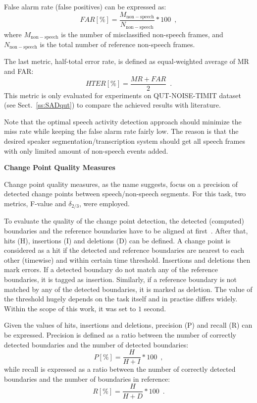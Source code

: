 \documentclass[FM,noheader,EN,bwtitles]{tulthesis}
\begin{document}
False alarm rate (false positives) can be expressed as:
\begin{equation}
FAR [\%] = \frac{M_{\mathrm{non-speech}}}{N_{\mathrm{non-speech}}} * 100 \enspace,
\label{eq:far}\end{equation}
where $M_\mathrm{{non-speech}}$ is the number of misclassified non-speech frames, and $N_\mathrm{{non-speech}}$ is the total number of reference non-speech frames.

The last metric, half-total error rate, is defined as equal-weighted average of MR and FAR:
\begin{equation}
HTER [\%] = \frac{MR + FAR}{2}\enspace.
\label{eq:hter}\end{equation}
This metric is only evaluated for experiments on QUT-NOISE-TIMIT dataset (see Sect.~\ref{ss:SADqut}) to compare the achieved results with literature.

Note that the optimal speech activity detection approach should minimize the miss rate while keeping the false alarm rate fairly low.
The reason is that the desired speaker segmentation/transcription system should get all speech frames with only limited amount of non-speech events added.

\bigskip
\noindent
\textbf{Change Point Quality Measures}
\medskip

\noindent 
Change point quality measures, as the name suggests, focus on a precision of detected change points between speech/non-speech segments.
For this task, two metrics, \mbox{F-value} and $\delta_{2/3}$, were employed.

To evaluate the quality of the change point detection, the detected (computed) boundaries and the reference boundaries have to be aligned at first~\parencite{DBLP:conf/interspeech/RasanenLA09a}.
After that, hits (H), insertions (I) and deletions (D) can be defined.
A change point is considered as a hit if the detected and reference boundaries are nearest to each other (timewise) and within certain time threshold.
Insertions and deletions then mark errors.
If a detected boundary do not match any of the reference boundaries, it is tagged as insertion.
Similarly, if a reference boundary is not matched by any of the detected boundaries, it is marked as deletion.
The value of the threshold hugely depends on the task itself and in practise differs widely.
Within the scope of this work, it was set to $1$ second.

Given the values of hits, insertions and deletions, precision (P) and recall (R) can be expressed.
Precision is defined as a ratio between the number of correctly detected boundaries and the number of detected boundaries:
\begin{equation}
P [\%] = \frac{H}{H+I} * 100\enspace,
\label{eq:prec}\end{equation}
while recall is expressed as a ratio between the number of correctly detected boundaries and the number of boundaries in reference: 
\begin{equation}
R [\%] = \frac{H}{H+D} * 100\enspace.
\label{eq:recl}\end{equation}
\end{document}
